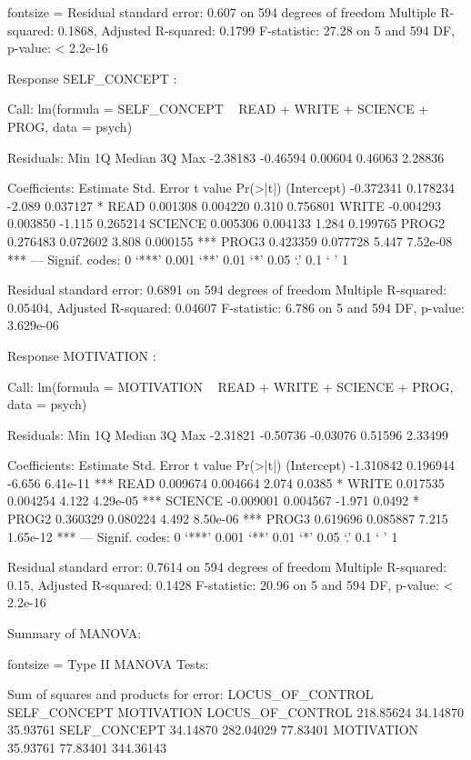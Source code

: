 \documentclass{article}
\begin{document}
\begin{enumerate}[leftmargin = 0 em, label = \arabic*., font = \bfseries]
\begin{enumerate}
\begin{rcode*}{fontsize = \footnotesize}
Residual standard error: 0.607 on 594 degrees of freedom
Multiple R-squared:  0.1868,	Adjusted R-squared:  0.1799 
F-statistic: 27.28 on 5 and 594 DF,  p-value: < 2.2e-16


Response SELF_CONCEPT :

Call:
lm(formula = SELF_CONCEPT ~ READ + WRITE + SCIENCE + PROG, data = psych)

Residuals:
     Min       1Q   Median       3Q      Max 
-2.38183 -0.46594  0.00604  0.46063  2.28836 

Coefficients:
             Estimate Std. Error t value Pr(>|t|)    
(Intercept) -0.372341   0.178234  -2.089 0.037127 *  
READ         0.001308   0.004220   0.310 0.756801    
WRITE       -0.004293   0.003850  -1.115 0.265214    
SCIENCE      0.005306   0.004133   1.284 0.199765    
PROG2        0.276483   0.072602   3.808 0.000155 ***
PROG3        0.423359   0.077728   5.447 7.52e-08 ***
---
Signif. codes:  0 ‘***’ 0.001 ‘**’ 0.01 ‘*’ 0.05 ‘.’ 0.1 ‘ ’ 1

Residual standard error: 0.6891 on 594 degrees of freedom
Multiple R-squared:  0.05404,	Adjusted R-squared:  0.04607 
F-statistic: 6.786 on 5 and 594 DF,  p-value: 3.629e-06


Response MOTIVATION :

Call:
lm(formula = MOTIVATION ~ READ + WRITE + SCIENCE + PROG, data = psych)

Residuals:
     Min       1Q   Median       3Q      Max 
-2.31821 -0.50736 -0.03076  0.51596  2.33499 

Coefficients:
             Estimate Std. Error t value Pr(>|t|)    
(Intercept) -1.310842   0.196944  -6.656 6.41e-11 ***
READ         0.009674   0.004664   2.074   0.0385 *  
WRITE        0.017535   0.004254   4.122 4.29e-05 ***
SCIENCE     -0.009001   0.004567  -1.971   0.0492 *  
PROG2        0.360329   0.080224   4.492 8.50e-06 ***
PROG3        0.619696   0.085887   7.215 1.65e-12 ***
---
Signif. codes:  0 ‘***’ 0.001 ‘**’ 0.01 ‘*’ 0.05 ‘.’ 0.1 ‘ ’ 1

Residual standard error: 0.7614 on 594 degrees of freedom
Multiple R-squared:   0.15,	Adjusted R-squared:  0.1428 
F-statistic: 20.96 on 5 and 594 DF,  p-value: < 2.2e-16
\end{rcode*}

Summary of MANOVA:
\begin{rcode*}{fontsize = \footnotesize}
Type II MANOVA Tests:

Sum of squares and products for error:
                 LOCUS_OF_CONTROL SELF_CONCEPT MOTIVATION
LOCUS_OF_CONTROL        218.85624     34.14870   35.93761
SELF_CONCEPT             34.14870    282.04029   77.83401
MOTIVATION               35.93761     77.83401  344.36143


\end{rcode*}
\end{enumerate}
\end{enumerate}
\end{document}
